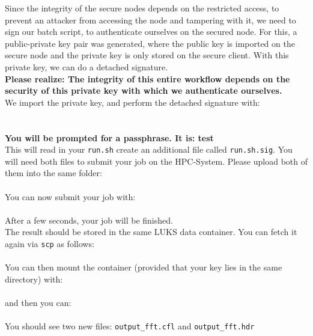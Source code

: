 \documentclass[paper=a4]{scrartcl}
\begin{document}
Since the integrity of the secure nodes depends on the restricted access, to prevent an attacker from accessing the node and tampering with it, we need to sign our batch script, to authenticate ourselves on the secured node. 
For this, a public-private key pair was generated, where the public key is imported on the secure node and the private key is only stored on the secure client. 
With this private key, we can do a detached signature. 
\\
\textbf{Please realize: The integrity of this entire workflow depends on the security of this private key with which we authenticate ourselves.}
\\
We import the private key, and perform the detached signature with: \\
\\ 
 \\
\textbf{You will be prompted for a passphrase. It is: test} \\
This will read in your \texttt{run.sh} create an additional file called \texttt{run.sh.sig}. 
You will need both files to submit your job on the HPC-System.
Please upload both of them into the same folder: \\
\\
You can now submit your job with: \\
\\
After a few seconds, your job will be finished.
\\
The result should be stored in the same LUKS data container. 
You can fetch it again via \texttt{scp} as follows: \\
\\
You can then mount the container (provided that your key lies in the same directory) with: \\
 \\
and then you can: \\
\\
You should see two new files: \texttt{output\_fft.cfl} and  \texttt{output\_fft.hdr}
\end{document}
